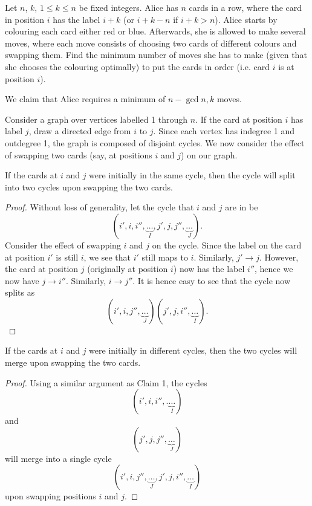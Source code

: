 \begin{question}[$n-\gcd{n, k}$]\label{A::2022-O-2-4}
    Let $n$, $k$, $1 \leq k \leq n$ be fixed integers. Alice has $n$ cards in a row, where the card in position $i$ has the label $i + k$ (or $i + k - n$ if $i + k > n$). Alice starts by colouring each card either red or blue. Afterwards, she is allowed to make several moves, where each move consists of choosing two cards of different colours and swapping them. Find the minimum number of moves she has to make (given that she chooses the colouring optimally) to put the cards in order (i.e. card $i$ is at position $i$).
\end{question}


 We claim that Alice requires a minimum of $n - \gcd{n, k}$ moves.

Consider a graph over vertices labelled 1 through $n$. If the card at position $i$ has label $j$, draw a directed edge from $i$ to $j$. Since each vertex has indegree 1 and outdegree 1, the graph is composed of disjoint cycles. We now consider the effect of swapping two cards (say, at positions $i$ and $j$) on our graph.

\begin{claim}{1}
    If the cards at $i$ and $j$ were initially in the same cycle, then the cycle will split into two cycles upon swapping the two cards.
\end{claim}
\begin{proof}
    Without loss of generality, let the cycle that $i$ and $j$ are in be \[(i', i, i'', \underbrace{\ldots}_{I}, j', j, j'', \underbrace{\ldots}_{J}).\] Consider the effect of swapping $i$ and $j$ on the cycle. Since the label on the card at position $i'$ is still $i$, we see that $i'$ still maps to $i$. Similarly, $j' \to j$. However, the card at position $j$ (originally at position $i$) now has the label $i''$, hence we now have $j \to i''$. Similarly, $i \to j''$. It is hence easy to see that the cycle now splits as \[(i', i, j'', \underbrace{\ldots}_{J})(j', j, i'', \underbrace{\ldots}_{I}).\]
\end{proof}

\begin{claim}{2}
    If the cards at $i$ and $j$ were initially in different cycles, then the two cycles will merge upon swapping the two cards.
\end{claim}
\begin{proof}
    Using a similar argument as Claim 1, the cycles \[(i', i, i'',. \underbrace{\ldots}_{I})\] and \[(j', j, j'', \underbrace{\ldots}_{J})\] will merge into a single cycle \[(i', i, j'', \underbrace{\ldots}_{J}, j', j, i'', \underbrace{\ldots}_{I})\] upon swapping positions $i$ and $j$.
\end{proof}

